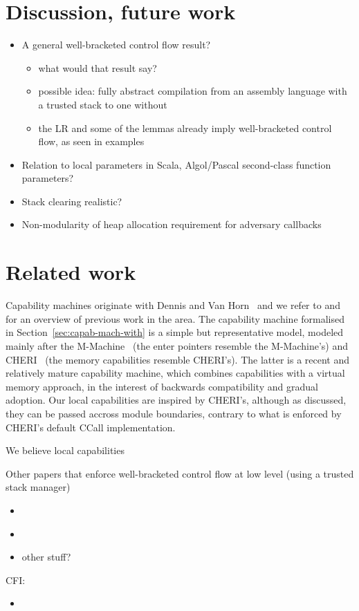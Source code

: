 \documentclass[compsoc,conference,letterpaper,fleqn]{IEEEtran}
\begin{document}
\section{Discussion, future work}
\label{sec:discussion}
\begin{itemize}
\item A general well-bracketed control flow result?
\begin{itemize}
\item what would that result say?
\item possible idea: fully abstract compilation from an assembly language with
a trusted stack to one without
\item the LR and some of the lemmas already imply well-bracketed control flow, as seen in examples
\end{itemize}
\item Relation to local parameters in Scala, Algol/Pascal second-class function parameters?
\item Stack clearing realistic?
\item Non-modularity of heap allocation requirement for adversary callbacks
\end{itemize}

\section{Related work}
\label{sec:related-work}

Capability machines originate with Dennis and Van
Horn~\cite{Dennis:1966:PSM:365230.365252} and we refer to
\citet{Levy1984capability} and \citet{Watson2015Cheri} for an overview of
previous work in the area. The capability machine formalised in
Section~\ref{sec:capab-mach-with} is a simple but representative model, modeled
mainly after the M-Machine~\cite{Carter:1994:HSF:195473.195579} (the enter
pointers resemble the M-Machine's) and
CHERI~\cite{Watson2015Cheri,Woodruff:2014:CCM:2665671.2665740} (the memory
capabilities resemble CHERI's). The latter is a recent and relatively mature
capability machine, which combines capabilities with a virtual memory approach,
in the interest of backwards compatibility and gradual adoption. Our local
capabilities are inspired by CHERI's, although as discussed, they can be passed
accross module boundaries, contrary to what is enforced by CHERI's default CCall
implementation.

We believe local capabilities 


Other papers that enforce well-bracketed control flow at low level (using a
trusted stack manager)
\begin{itemize}
\item \cite{patrignani_modular_2016-1}
\item \cite{juglaret_beyond_2016-1}
\item other stuff?
\end{itemize}
CFI: 
\begin{itemize}
\item \cite{budiu_architectural_2006,abadi_control-flow_2005}
\end{itemize}
\end{document}
